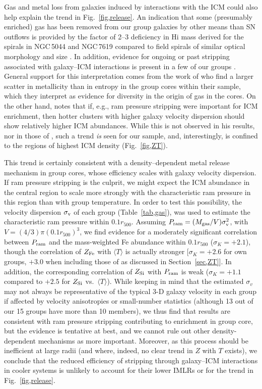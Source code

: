 \documentclass[useAMS,usenatbib]{mn2e}
\begin{document}
Gas and metal loss from galaxies induced by interactions with the ICM
could also help explain the trend in Fig.~\ref{fig,release}. An
indication that some (presumably enriched) gas has been removed from
our group galaxies by other means than SN outflows is provided by the
factor of 2--3 deficiency in H{\sc i} mass derived for the spirals in
NGC\,5044 and NGC\,7619 compared to field spirals of similar optical
morphology and size \citep{seng06}. In addition, evidence for ongoing
or past stripping associated with galaxy--ICM interactions is present
in a few of our groups \citep*{rasm06,mend09}. General support for
this interpretation comes from the work of \citet{fino06} who find a
larger scatter in metallicity than in entropy in the group cores
within their sample, which they interpret as evidence for diversity in
the origin of gas in the cores. On the other hand, \citet{renz04}
notes that if, e.g., ram pressure stripping were important for ICM
enrichment, then hotter clusters with higher galaxy velocity
dispersion should show relatively higher ICM abundances. While this is
not observed in his results, nor in those of \citet{baum05}, such a
trend {\em is} seen for our sample, and, interestingly, is confined to
the regions of highest ICM density (Fig.~\ref{fig,ZT}).

This trend is certainly consistent with a density--dependent metal
release mechanism in group cores, whose efficiency scales with galaxy
velocity dispersion. If ram pressure stripping is the culprit, we
might expect the ICM abundance in the central region to scale more
strongly with the characteristic ram pressure in this region than with
group temperature. In order to test this possibility, the velocity
dispersion $\sigma_{\rm v}$ of each group (Table~\ref{tab,gas}), was
used to estimate the characteristic ram pressure within
$0.1r_{500}$. Assuming $P_{\rm ram} = (M_{\rm gas}/V) \sigma_{\rm
v}^2$, with $V=(4/3)\pi (0.1r_{500})^3$, we find evidence for a
moderately significant correlation between $P_{\rm ram}$ and the
mass-weighted Fe abundance within $0.1r_{500}$ ($\sigma_K = +2.1$),
though the correlation of $Z_{\rm Fe}$ with $\langle T\rangle$ is
actually stronger [$\sigma_K = +2.6$ for own groups, $+3.0$ when
including those of \citet{fino06,fino07} as discussed in
Section~\ref{sec,ZT}].  In addition, the corresponding correlation of
$Z_{\rm Si}$ with $P_{\rm ram}$ is weak ($\sigma_K=+1.1$ compared to
$+2.5$ for $Z_{\rm Si}$ vs.\ $\langle T\rangle$). While keeping in
mind that the estimated $\sigma_v$ may not always be representative of
the typical 3-D galaxy velocity in each group if affected by velocity
anisotropies or small-number statistics (although 13 out of our 15
groups have more than 10 members), we thus find that results are
consistent with ram pressure stripping contributing to enrichment in
group core, but the evidence is tentative at best, and we cannot rule
out other density-dependent mechanisms as more important. Moreover, as
this process should be inefficient at large radii (and where, indeed,
no clear trend in $Z$ with $T$ exists), we conclude that the reduced
efficiency of stripping through galaxy--ICM interactions in cooler
systems is unlikely to account for their lower IMLRs or for the trend
in Fig.~\ref{fig,release}.
\end{document}
